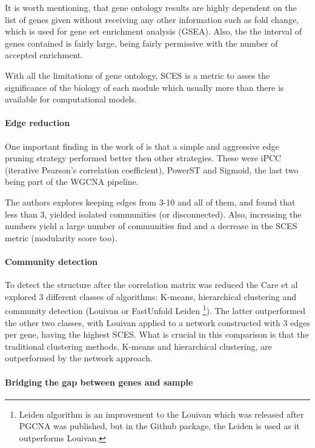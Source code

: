 It is worth mentioning, that gene ontology results are highly dependent on the list of genes given without receiving any other information such as fold change, which is used for gene set enrichment analysis (GSEA). Also, the the interval of genes contained is fairly large, being fairly permissive with the number of accepted enrichment.

With all the limitations of gene ontology, SCES is a metric to asses the significance of the biology of each module which usually more than there is available for computational models.

\paragraph*{Edge reduction}

One important finding in the work of \citet{Care2019-ij} is that a simple and aggressive edge pruning strategy performed better then other strategies. These were iPCC (iterative Pearson’s correlation coefficient), PowerST and Sigmoid, the last two being part of the WGCNA pipeline.

The authors explores keeping edges from 3-10 and all of them, and found that less than 3, yielded isolated communities (or disconnected). Also, increasing the numbers yield a large number of communities find and a decrease in the SCES metric (modularity score too).

\paragraph*{Community detection}

To detect the structure after the correlation matrix was reduced the Care et al explored 3 different classes of algorithms: K-means, hierarchical clustering and community detection (Louivan\citet{Blondel2008-ik} or FastUnfold Leiden \citet{Traag2019-ne}\footnote{Leiden algorithm is an improvement to the Louivan which was released after PGCNA was published, but in the Github package, the Leiden is used as it outperforms Louivan.}). The latter outperformed the other two classes, with Louivan applied to a network constructed with 3 edges per gene, having the highest SCES. What is crucial in this comparison is that the traditional clustering methods, K-means and hierarchical clustering, are outperformed by the network approach.

\paragraph*{Bridging the gap between genes and sample}


